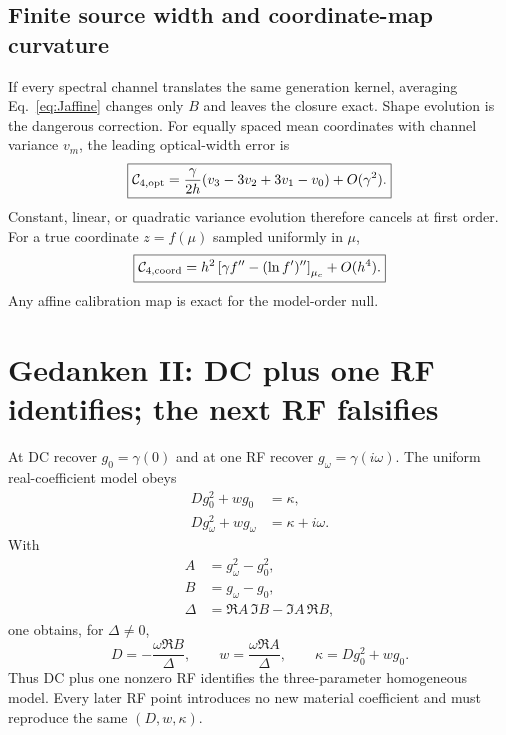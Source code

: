 \documentclass[11pt]{article}
\begin{document}
\subsection{Finite source width and coordinate-map curvature}
If every spectral channel translates the same generation kernel, averaging Eq.~\eqref{eq:Jaffine} changes only $B$ and leaves the closure exact. Shape evolution is the dangerous correction. For equally spaced mean coordinates with channel variance $v_m$, the leading optical-width error is
\begin{equation}
\boxed{\mathcal{C}_{4,\rm opt}=\frac{\gamma}{2h}(v_3-3v_2+3v_1-v_0)+O(\gamma^2).}
\end{equation}
Constant, linear, or quadratic variance evolution therefore cancels at first order. For a true coordinate $z=f(\mu)$ sampled uniformly in $\mu$,
\begin{equation}
\boxed{\mathcal{C}_{4,\rm coord}=h^2\left[\gamma f''-(\ln f')''\right]_{\mu_c}+O(h^4).}
\end{equation}
Any affine calibration map is exact for the model-order null.

\section{Gedanken II: DC plus one RF identifies; the next RF falsifies}
At DC recover $g_0=\gamma(0)$ and at one RF recover $g_\omega=\gamma(i\omega)$. The uniform real-coefficient model obeys
\begin{align}
Dg_0^2+w g_0&=\kappa,\\
Dg_\omega^2+w g_\omega&=\kappa+i\omega.
\end{align}
With
\begin{align}
A&=g_\omega^2-g_0^2,\\
B&=g_\omega-g_0,\\
\Delta&=\Re A\,\Im B-\Im A\,\Re B,
\end{align}
one obtains, for $\Delta\neq0$,
\begin{equation}
\boxed{D=-\frac{\omega\Re B}{\Delta},\qquad
w=\frac{\omega\Re A}{\Delta},\qquad
\kappa=Dg_0^2+w g_0.}
\label{eq:inverse}
\end{equation}
Thus DC plus one nonzero RF identifies the three-parameter homogeneous model. Every later RF point introduces no new material coefficient and must reproduce the same $(D,w,\kappa)$.
\end{document}
